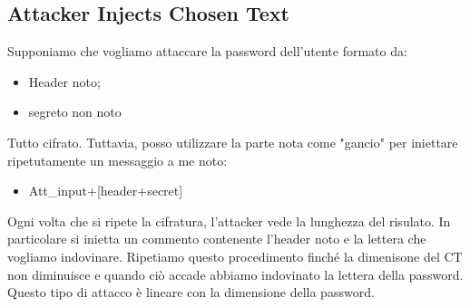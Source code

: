 \documentclass{book}
\theoremstyle{remark}
\begin{document}
\subsection{Attacker Injects Chosen Text}
Supponiamo che vogliamo attaccare la password dell'utente formato da:\begin{itemize}
	\item Header noto;\@\item segreto non noto
\end{itemize}
Tutto cifrato\@. Tuttavia, posso utilizzare la parte nota come "gancio" per iniettare ripetutamente un messaggio a me noto:\begin{itemize}
	\item Att\_input+[header+secret]
\end{itemize}
Ogni volta che si ripete la cifratura, l'attacker vede la lunghezza del risulato\@. In particolare si inietta un commento contenente l'header noto e la lettera che vogliamo indovinare\@. Ripetiamo questo procedimento finché la dimenisone del CT non diminuisce e quando ciò accade abbiamo indovinato la lettera della password\@. Questo tipo di attacco è lineare con la dimensione della password\@.
\end{document}
